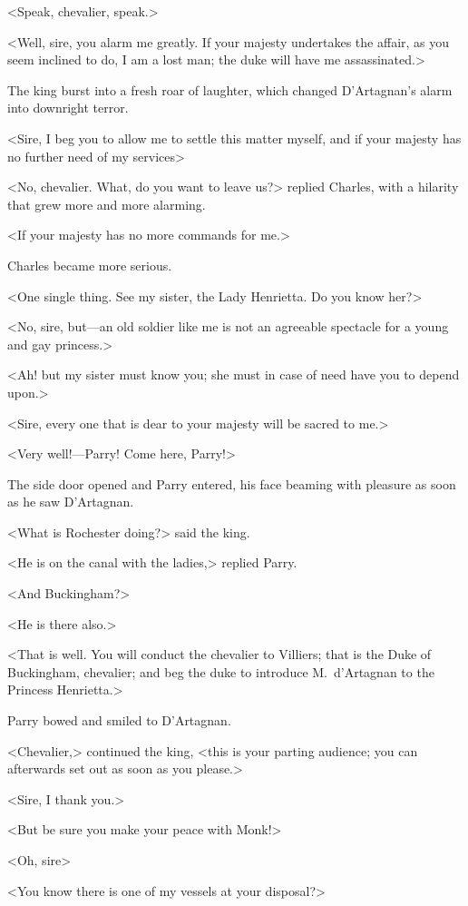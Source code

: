 <Speak, chevalier, speak.>

<Well, sire, you alarm me greatly. If your majesty undertakes the affair, as you seem inclined to do, I am a lost man; the duke will have me assassinated.>

The king burst into a fresh roar of laughter, which changed D'Artagnan's alarm into downright terror.

<Sire, I beg you to allow me to settle this matter myself, and if your majesty has no further need of my services\longdash>

<No, chevalier. What, do you want to leave us?> replied Charles, with a hilarity that grew more and more alarming.

<If your majesty has no more commands for me.>

Charles became more serious.

<One single thing. See my sister, the Lady Henrietta. Do you know her?>

<No, sire, but—an old soldier like me is not an agreeable spectacle for a young and gay princess.>

<Ah! but my sister must know you; she must in case of need have you to depend upon.>

<Sire, every one that is dear to your majesty will be sacred to me.>

<Very well!—Parry! Come here, Parry!>

The side door opened and Parry entered, his face beaming with pleasure as soon as he saw D'Artagnan.

<What is Rochester doing?> said the king.

<He is on the canal with the ladies,> replied Parry.

<And Buckingham?>

<He is there also.>

<That is well. You will conduct the chevalier to Villiers; that is the Duke of Buckingham, chevalier; and beg the duke to introduce M.~d'Artagnan to the Princess Henrietta.>

Parry bowed and smiled to D'Artagnan.

<Chevalier,> continued the king, <this is your parting audience; you can afterwards set out as soon as you please.>

<Sire, I thank you.>

<But be sure you make your peace with Monk!>

<Oh, sire\longdash>

<You know there is one of my vessels at your disposal?>


